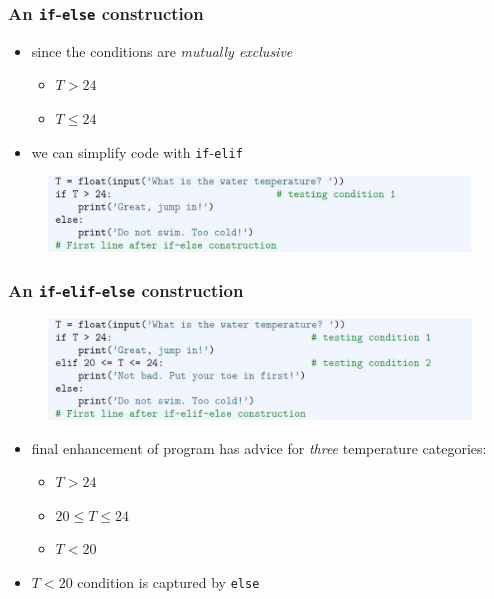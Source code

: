 \documentclass[english,14pt]{beamer}
\newcommand\red[1]{{\color{red} #1}}
\begin{document}

\begin{frame}[fragile]

\frametitle{An \texttt{if}-\texttt{else} construction}

\begin{itemize}
	\item since the conditions are \red{\emph{mutually exclusive}}
	\begin{itemize}
		\item $T > 24$
		\item $T \leq 24$
	\end{itemize}
	\item we can simplify code with \texttt{if}-\texttt{elif}
\end{itemize}
	
\begin{figure}[ht]
	\centering
	\includegraphics[width=\textwidth]{figures/LLp69a}
\end{figure}

\end{frame}


\begin{frame}[fragile]

\frametitle{An \texttt{if}-\texttt{elif}-\texttt{else} construction}

\begin{figure}[ht]
	\centering
	\includegraphics[width=\textwidth]{figures/LLp69b}
\end{figure}

\begin{itemize}
\item final enhancement of program has advice for \emph{three} temperature categories:
	\begin{itemize}
		\item $T > 24$
		\item $20 \leq T \leq 24$
		\item $T < 20$
	\end{itemize}
	\item $T < 20$ condition is captured by \texttt{else}
\end{itemize}

\end{frame}
\end{document}
